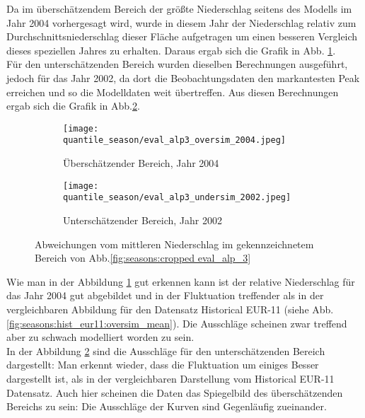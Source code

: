 Da im überschätzendem Bereich der größte Niederschlag seitens des Modells im Jahr 2004 vorhergesagt wird, wurde in diesem Jahr der Niederschlag relativ zum Durchschnittsniederschlag dieser Fläche aufgetragen um einen besseren Vergleich dieses speziellen Jahres zu erhalten. Daraus ergab sich die Grafik in Abb. \ref{fig:seasons:pr_oversim_eval_alp3}.\\
Für den unterschätzenden Bereich wurden dieselben Berechnungen ausgeführt, jedoch für das Jahr 2002, da dort die Beobachtungsdaten den markantesten Peak erreichen und so die Modelldaten weit übertreffen. Aus diesen Berechnungen ergab sich die Grafik in Abb.\ref{fig:seasons:pr_undersim_eval_alp3}.\\
\begin{figure}[h]
	\begin{subfigure}{0.49\textwidth}
		\texttt{[image: quantile\_season/eval\_alp3\_oversim\_2004.jpeg]}
		\caption{Überschätzender Bereich, Jahr 2004}
		\label{fig:seasons:pr_oversim_eval_alp3}
	\end{subfigure}
	\begin{subfigure}{0.49\textwidth}
		\texttt{[image: quantile\_season/eval\_alp3\_undersim\_2002.jpeg]}
		\caption{Unterschätzender Bereich, Jahr 2002}
		\label{fig:seasons:pr_undersim_eval_alp3}
	\end{subfigure}
	\caption{Abweichungen vom mittleren Niederschlag im gekennzeichnetem Bereich von Abb.\ref{fig:seasons:cropped eval_alp_3}}
	\label{fig:seasons:pr_over_undersim_eval_alp3}
\end{figure}
Wie man in der Abbildung \ref{fig:seasons:pr_oversim_eval_alp3} gut erkennen kann ist der relative Niederschlag für das Jahr 2004 gut abgebildet und in der Fluktuation treffender als in der vergleichbaren Abbildung  für den Datensatz Historical EUR-11 (siehe Abb.\ref{fig:seasons:hist_eur11:oversim_mean}). Die Ausschläge scheinen zwar treffend aber zu schwach modelliert worden zu sein.\\
In der Abbildung \ref{fig:seasons:pr_undersim_eval_alp3} sind die Ausschläge für den unterschätzenden Bereich dargestellt: Man erkennt wieder, dass die Fluktuation um einiges Besser dargestellt ist, als in der vergleichbaren Darstellung vom Historical EUR-11 Datensatz. Auch hier scheinen die Daten das Spiegelbild des überschätzenden Bereichs zu sein: Die Ausschläge der Kurven sind Gegenläufig zueinander.\newpage
